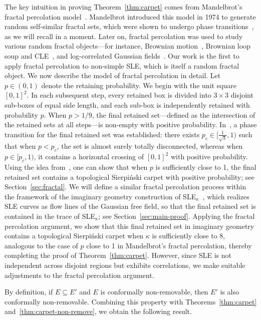 \documentclass[a4paper]{article}
\numberwithin{equation}{section}
\numberwithin{equation}{section}
\renewcommand{\1}{\mathbf{1}}
\begin{document}
The key intuition in proving Theorem~\ref{thm:carpet} comes from Mandelbrot's fractal percolation model~\cite{mandelbrot-fractal}. Mandelbrot introduced this model in 1974 to generate random self-similar fractal sets, which were shown to undergo phase transitions~\cite{CCD-fractal, CCD-3d-fractal}, as we will recall in a moment. Later on, fractal percolation was used to study various random fractal objects---for instance, Brownian motion~\cite{Peres-intersection}, Brownian loop soup and CLE~\cite{SW-CLE}, and log-correlated Gaussian fields~\cite{DGZ-thick-point}. Our work is the first to apply fractal percolation to non-simple SLE, which is itself a random fractal object. We now describe the model of fractal percolation in detail. Let $p \in (0,1)$ denote the retaining probability. We begin with the unit square $[0,1]^2$.
In each subsequent step, every retained box is divided into $3 \times 3$ disjoint sub-boxes of equal side length, and each sub-box is independently retained with probability $p$. When $p > 1/9$, the final retained set---defined as the intersection of the retained sets at all steps---is non-empty with positive probability. In~\cite{CCD-fractal}, a phase transition for the final retained set was established: there exists $p_c \in [\frac{1}{\sqrt{3}},1)$ such that when $p < p_c$, the set is almost surely totally disconnected, whereas when $p \in [p_c, 1)$, it contains a horizontal crossing of $[0,1]^2$ with positive probability. Using the idea from~\cite{CCD-fractal}, one can show that when $p$ is sufficiently close to 1, the final retained set contains a topological Sierpi\'nski carpet with positive probability; see Section~\ref{sec:fractal}. We will define a similar fractal percolation process within the framework of the imaginary geometry construction of SLE$_\kappa$~\cite{IG1,IG4}, which realizes SLE curves as flow lines of the Gaussian free field, so that the final retained set is contained in the trace of SLE$_\kappa$; see Section~\ref{sec:main-proof}. Applying the fractal percolation argument, we show that this final retained set in imaginary geometry contains a topological Sierpi\'nski carpet when $\kappa$ is sufficiently close to 8, analogous to the case of $p$ close to 1 in Mandelbrot's fractal percolation, thereby completing the proof of Theorem~\ref{thm:carpet}. However, since SLE is not independent across disjoint regions but exhibits correlations, we make suitable adjustments to the fractal percolation argument.

By definition, if $E \subseteq E'$ and $E$ is conformally non-removable, then $E'$ is also conformally non-removable. Combining this property with Theorems~\ref{thm:carpet} and~\ref{thm:carpet-non-remove}, we obtain the following result.
\end{document}
